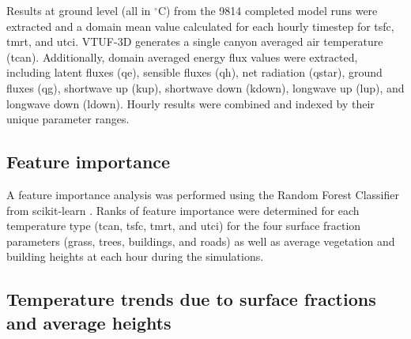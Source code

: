 \documentclass[final,3p,times,authoryear]{elsarticle}
\begin{document}
Results  at ground level (all in $^{\circ}$C) from the 9814 completed model runs were extracted and a domain mean value calculated for each hourly timestep for \gls{tsfc}, \gls{tmrt}, and \gls{utci}. VTUF-3D generates a single canyon averaged air temperature (\gls{tcan}). Additionally, domain averaged energy flux values were extracted, including latent fluxes (\gls{qe}), sensible fluxes (\gls{qh}), net radiation (\gls{qstar}), ground fluxes (\gls{qg}), shortwave up (\gls{kup}), shortwave down (\gls{kdown}), longwave up (\gls{lup}), and longwave down (\gls{ldown}). Hourly results were combined and indexed by their unique parameter ranges.


\subsection{Feature importance}\label{sec:methodsfeat}
%

A feature importance analysis was performed using the Random Forest Classifier from  scikit-learn \citep{scikit-learn}. Ranks of feature importance were determined for each temperature type (\gls{tcan}, \gls{tsfc}, \gls{tmrt}, and \gls{utci}) for the four surface fraction parameters (grass, trees, buildings, and roads) as well as average vegetation and building heights at each hour during the simulations.


\subsection{Temperature trends due to surface fractions and average heights}\label{sec:methodstempvspercent}
\end{document}
